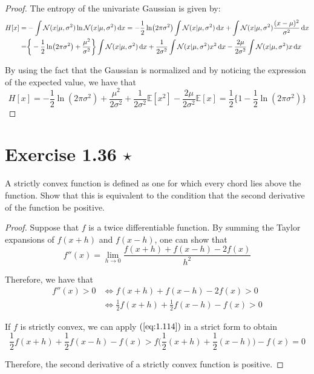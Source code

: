 \begin{proof}
    The entropy of the univariate Gaussian is given by:
    \begin{align*}
        H[x] 
        =& -\int \mathcal{N}(x | \mu, \sigma^2) \ln \mathcal{N}(x | \mu, \sigma^2) \mathop{}\!\mathrm{d} x
        = -\frac{1}{2} \ln (2\pi \sigma^2) \int \mathcal{N}(x | \mu, \sigma^2) \mathop{}\!\mathrm{d} x 
            + \int \mathcal{N}(x | \mu, \sigma^2) \frac{(x - \mu)^2}{\sigma^2} \mathop{}\!\mathrm{d} x \\
        =& \bigg\{-\frac{1}{2} \ln (2\pi \sigma^2) + \frac{\mu^2}{\sigma^2} \bigg\}
            \int \mathcal{N}(x | \mu, \sigma^2) \mathop{}\!\mathrm{d} x 
            + \frac{1}{2\sigma^2} \int \mathcal{N}(x | \mu, \sigma^2) x^2 \mathop{}\!\mathrm{d} x 
            - \frac{2\mu}{2\sigma^2} \int \mathcal{N}(x | \mu, \sigma^2) x\mathop{}\!\mathrm{d} x
    \end{align*}

    By using the fact that the Gaussian is normalized and 
    by noticing the expression of the expected value, we have that
    \[
        H[x] 
        = -\frac{1}{2} \ln(2\pi \sigma^2) 
        + \frac{\mu^2}{2\sigma^2} 
        + \frac{1}{2\sigma^2} \mathbb{E}[x^2]
        - \frac{2\mu}{2\sigma^2} \mathbb{E}[x]
        = \frac{1}{2} \bigg\{1 - \frac{1}{2} \ln(2\pi \sigma^2)\bigg\} \tag{1.110}
    \]
\end{proof}

\section*{Exercise 1.36 $\star$}
A strictly convex function is defined as one for which every chord lies
above the function. Show that this is equivalent to the condition that
the second derivative of the function be positive.

\vspace{1em}

\begin{proof}
    Suppose that $f$ is a twice differentiable function. By 
    summing the Taylor expansions of $f(x + h)$ and $f(x - h)$, 
    one can show that
    \[
        f''(x) = \lim_{h \to 0} \frac{f(x + h) + f(x - h) - 2f(x)}{h^2}
    \] 

    Therefore, we have that
    \begin{align*}
        f''(x) > 0 
        &\iff f(x + h) + f(x - h) - 2f(x) > 0 \\
        & \iff \frac{1}{2} f(x + h) + \frac{1}{2} f(x - h) - f(x) > 0
    \end{align*}

    If $f$ is strictly convex, we can apply $(\ref{eq:1.114})$ in a strict form to obtain 
    \[
        \frac{1}{2} f(x + h) + \frac{1}{2} f(x - h) - f(x) >
        f\bigg(\frac{1}{2}(x+h) + \frac{1}{2}(x - h)\bigg) - f(x) = 0
    \] 

    Therefore, the second derivative of a strictly convex function is positive.
\end{proof}

